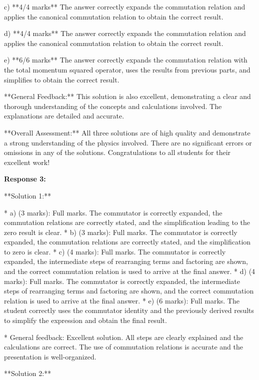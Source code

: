 \documentclass[a4paper,11pt]{article}
\begin{document}
c) **4/4 marks**
The answer correctly expands the commutation relation and applies the canonical commutation relation to obtain the correct result.

d) **4/4 marks**
The answer correctly expands the commutation relation and applies the canonical commutation relation to obtain the correct result.

e) **6/6 marks**
The answer correctly expands the commutation relation with the total momentum squared operator, uses the results from previous parts, and simplifies to obtain the correct result.

**General Feedback:** This solution is also excellent, demonstrating a clear and thorough understanding of the concepts and calculations involved. The explanations are detailed and accurate.

**Overall Assessment:** All three solutions are of high quality and demonstrate a strong understanding of the physics involved. There are no significant errors or omissions in any of the solutions. Congratulations to all students for their excellent work!

\textbf{Response 3:}

**Solution 1:**

* a) (3 marks): Full marks. The commutator is correctly expanded, the commutation relations are correctly stated, and the simplification leading to the zero result is clear.
* b) (3 marks): Full marks. The commutator is correctly expanded, the commutation relations are correctly stated, and the simplification to zero is clear.
* c) (4 marks): Full marks. The commutator is correctly expanded, the intermediate steps of rearranging terms and factoring are shown, and the correct commutation relation is used to arrive at the final answer.
* d) (4 marks): Full marks. The commutator is correctly expanded, the intermediate steps of rearranging terms and factoring are shown, and the correct commutation relation is used to arrive at the final answer.
* e) (6 marks): Full marks. The student correctly uses the commutator identity and the previously derived results to simplify the expression and obtain the final result. 

* General feedback: Excellent solution. All steps are clearly explained and the calculations are correct. The use of commutation relations is accurate and the presentation is well-organized.

**Solution 2:**
\end{document}
